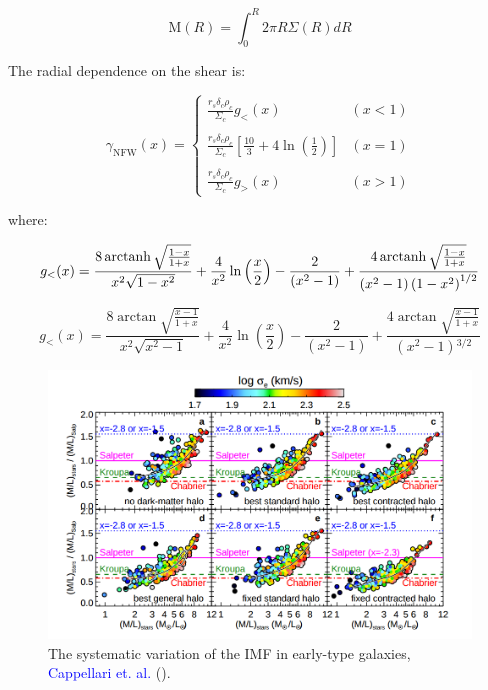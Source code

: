 \begin{appendices}
\begin{equation}
\text{M}(R)=\int_{0}^{R}2\pi R\Sigma(R)dR
\end{equation}

The radial dependence on the shear is:

\begin{equation}
\gamma_{\text{NFW}}(x) = \left\lbrace
\begin{array}{lll}
\frac{r_{s}\delta_{c}\rho_{c}}{\Sigma_c}g_{<}(x) & (x<1)\\\\
\frac{r_{s}\delta_{c}\rho_{c}}{\Sigma_c}\left[\frac{10}{3}+4 \ln \left(\frac{1}{2}\right)\right] & (x=1)\\\\
\frac{r_{s}\delta_{c}\rho_{c}}{\Sigma_c}g_{>}(x) & (x>1)
\end{array}
\right.
\end{equation} 

where: 

\begin{equation}
g_{<}(x)=\frac{8 \operatorname{arctanh} \sqrt{\frac{1-x}{1+x}}}{x^{2}\sqrt{1-x^{2}}}+\frac{4}{x^{2}} \ln \left(\frac{x}{2}\right)-\frac{2}{\left(x^{2}-1\right)}+\frac{4 \operatorname{arctanh} \sqrt{\frac{1-x}{1+x}}}{\left(x^{2}-1\right)\left(1-x^{2}\right)^{1/2}}
\end{equation}

\begin{equation}
g_{<}(x)=\frac{8 \arctan \sqrt{\frac{x-1}{1+x}}}{x^{2}\sqrt{x^{2}-1}}+\frac{4}{x^{2}}\ln \left(\frac{x}{2}\right)-\frac{2}{\left(x^{2}-1\right)}+\frac{4 \arctan \sqrt{\frac{x-1}{1+x}}}{\left(x^{2}-1\right){}^{3/2}}
\end{equation}  

\begin{figure}[H]
\centering
\includegraphics[width=12cm]{images/IMFs_paper.png}
\caption[The systematic variation of the IMF in early-type galaxies.]{The systematic variation of the IMF in early-type galaxies, \textcolor{blue}{Cappellari et. al.} (\citeyear{Reference19}).}
\end{figure}
 
\end{appendices}